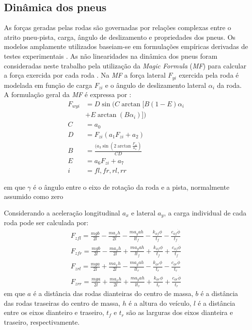 \vspace{-5mm}
\subsection{ Dinâmica dos pneus }

As forças geradas pelas rodas são governadas por relações complexas entre o
atrito pneu-pista, carga, ângulo de deslizamento e propriedades dos pneus. Os
modelos amplamente utilizados baseiam-se em formulações empíricas derivadas de
testes experimentais \cite{Dugoff1969}. 
As não linearidades na dinâmica dos pneus 
foram consideradas neste trabalho pela utilização da \emph{Magic Formula} (\emph{MF}) 
para calcular a força exercida por cada roda \cite{Shoutao2017}.
Na \emph{MF} a força lateral $F_{yi}$ exercida pela roda é modelada em função de
carga $F_{zi}$ e o ângulo de deslizamento lateral $\alpha_i$ da roda.
A formulação geral da \emph{MF} é expressa por \cite{Li2017}:
\vspace{-2.5mm}
\begin{equation}
\label{eq:MFY}
\begin{split}
		F_{wyi}  & = D\sin(C\arctan[B(1-E)\alpha_i \\ 
			     & + E\arctan(B\alpha_i)]) \\
			  C  & = a_0 \\
			  D  & = F_{zi}(a_1F_{zi} + a_2 ) \\
			  B  & = \frac{(a_3\sin(2\arctan\frac{F_{zi}}{a_4})}{CD} \\
			  E  & = a_6F_{zi} + a_7 \\
			  i  & = fl,fr,rl,rr
\end{split}
\end{equation}

\noindent em que $\gamma$ é o ângulo entre o eixo de rotação da roda e a pista,
normalmente assumido como zero 

Considerando a aceleração longitudinal $a_x$ e lateral $a_y$, a carga individual
de cada roda pode ser calculada por:
\begin{equation}
\label{eq:wload}
\begin{split}
    F_{zfl} =  \frac{mgb}{2l} - \frac{ma_xh}{2l} - \frac{ma_yah}{lt_f} -
    \frac{k_{\phi f}\phi}{t_f} - \frac{c_{\phi f}\dot\phi}{t_f} \\
    F_{zfr} =  \frac{mgb}{2l} - \frac{ma_xh}{2l} + \frac{ma_yah}{lt_f} +
    \frac{k_{\phi f}\phi}{t_f} + \frac{c_{\phi f}\dot\phi}{t_f} \\
    F_{zrl} =  \frac{mga}{2l} + \frac{ma_xh}{2l} - \frac{ma_yah}{lt_r} - 
    \frac{k_{\phi r}\phi}{t_r} - \frac{c_{\phi r}\dot\phi}{t_r} \\
    F_{zrr} =  \frac{mga}{2l} + \frac{ma_xh}{2l} + \frac{ma_yah}{lt_r} + 
    \frac{k_{\phi r}\phi}{t_r} + \frac{c_{\phi r}\dot\phi}{t_r}
\end{split}
\end{equation}
\noindent em que $a$ é a distância das rodas dianteiras do centro de massa, $b$
é a distância das rodas traseiras do centro de massa, $h$ é a altura do veículo,
$l$ é a distância entre os eixos dianteiro e traseiro, $t_f$ e $t_r$ são as
larguras dos eixos dianteira e traseiro, respectivamente.

